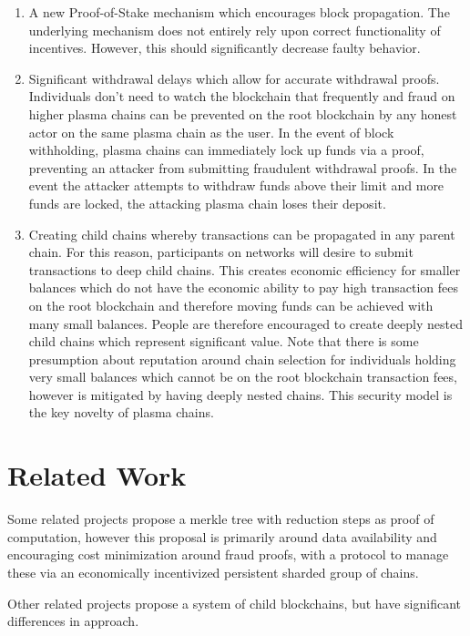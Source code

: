 \documentclass[letterpaper, 11pt]{article}
\begin{document}
\begin{enumerate}
	\item 
		A new Proof-of-Stake mechanism which encourages block propagation.
		The underlying mechanism does not entirely rely upon correct
		functionality of incentives. However, this should significantly
		decrease faulty behavior.

	\item 
		Significant withdrawal delays which allow for accurate withdrawal
		proofs. Individuals don't need to watch the blockchain that
		frequently and fraud on higher plasma chains can be prevented on
		the root blockchain by any honest actor on the same plasma chain
		as the user. In the event of block withholding, plasma chains
		can immediately lock up funds via a proof, preventing an
		attacker from submitting fraudulent withdrawal proofs. In the
		event the attacker attempts to withdraw funds above their limit
		and more funds are locked, the attacking plasma chain loses
		their deposit.

	\item 
		Creating child chains whereby transactions can be propagated in
		any parent chain. For this reason, participants on networks will
		desire to submit transactions to deep child chains. This creates
		economic efficiency for smaller balances which do not have the
		economic ability to pay high transaction fees on the root
		blockchain and therefore moving funds can be achieved with many
		small balances. People are therefore encouraged to create deeply
		nested child chains which represent significant value. Note that
		there is some presumption about reputation around chain
		selection for individuals holding very small balances which
		cannot be on the root blockchain transaction fees, however is
		mitigated by having deeply nested chains. This security model is
		the key novelty of plasma chains.
\end{enumerate}

\section{Related Work}

Some related projects propose a merkle tree with reduction steps as proof of
computation, however this proposal is primarily around data availability and
encouraging cost minimization around fraud proofs, with a protocol to manage
these via an economically incentivized persistent sharded group of chains.

Other related projects propose a system of child blockchains, but have
significant differences in approach.
\end{document}
